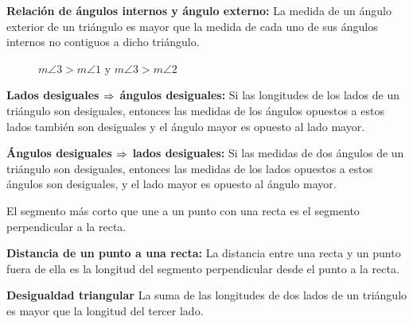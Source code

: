 \begin{theorem}{\textbf{Relación de ángulos internos y ángulo externo:}}
La medida de un ángulo exterior de un triángulo es mayor que la medida de cada uno de sus ángulos internos no contiguos a dicho triángulo.

    \begin{figure}[!h]
        \centering
        
        \caption{$m\angle{3} > m\angle{1}$ y $m\angle{3} > m\angle{2}$}
        \label{fig:intext-angles-diff}
    \end{figure}

\end{theorem}

\begin{theorem}{\textbf{Lados desiguales $\Rightarrow$ ángulos desiguales:}}
    Si las longitudes de los lados de un triángulo son desiguales, entonces las medidas de los ángulos opuestos a estos lados también son desiguales y el ángulo mayor es opuesto al lado mayor.

\end{theorem}

\begin{theorem}{\textbf{Ángulos desiguales $\Rightarrow$ lados desiguales:}}
    Si las medidas de dos ángulos de un triángulo son desiguales, entonces las medidas de los lados opuestos a estos ángulos son desiguales, y el lado mayor es opuesto al ángulo mayor.
\end{theorem}

\begin{theorem}
    El segmento más corto que une a un punto con una recta es el segmento perpendicular a la recta.

    \begin{figure}[!h]
        \centering
        
        \label{fig:theorem6}
    \end{figure}
    
\end{theorem}

\begin{definition}{\textbf{Distancia de un punto a una recta:}}
    La distancia entre una recta y un punto fuera de ella es la longitud del segmento perpendicular desde el punto a la recta.
\end{definition}

\begin{theorem}{\textbf{Desigualdad triangular}}
    La suma de las longitudes de dos lados de un triángulo es mayor que la longitud del tercer lado.
\end{theorem}

